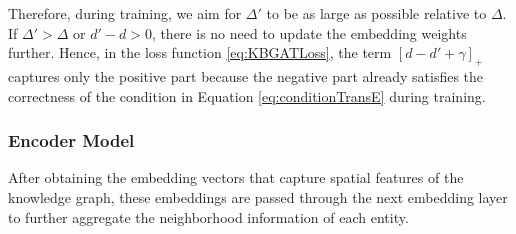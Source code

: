 Therefore, during training, we aim for $\Delta'$ to be as large as possible relative to $\Delta$. If $\Delta' > \Delta$ or $d' - d > 0$, there is no need to update the embedding weights further. Hence, in the loss function \ref{eq:KBGATLoss}, the term $[d - d' + \gamma]_{+}$ captures only the positive part because the negative part already satisfies the correctness of the condition in Equation \ref{eq:conditionTransE} during training.



\subsubsection{Encoder Model}
\label{sec:encodeKBGAT}

After obtaining the embedding vectors that capture spatial features of the knowledge graph, these embeddings are passed through the next embedding layer to further aggregate the neighborhood information of each entity.


